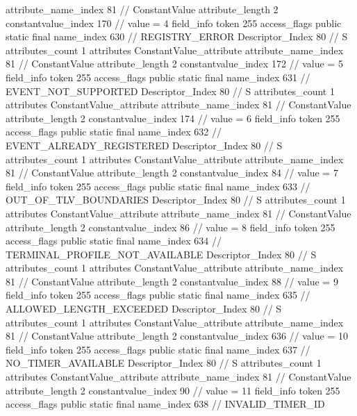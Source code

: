 {{{{{{{					attribute_name_index	81		// ConstantValue
					attribute_length	2
					constantvalue_index	170		// value = 4
				}
				}
			}
			field_info {
				token	255
				access_flags	public static final
				name_index	630		// REGISTRY_ERROR
				Descriptor_Index	80		// S
				attributes_count	1
				attributes {
				ConstantValue_attribute {
					attribute_name_index	81		// ConstantValue
					attribute_length	2
					constantvalue_index	172		// value = 5
				}
				}
			}
			field_info {
				token	255
				access_flags	public static final
				name_index	631		// EVENT_NOT_SUPPORTED
				Descriptor_Index	80		// S
				attributes_count	1
				attributes {
				ConstantValue_attribute {
					attribute_name_index	81		// ConstantValue
					attribute_length	2
					constantvalue_index	174		// value = 6
				}
				}
			}
			field_info {
				token	255
				access_flags	public static final
				name_index	632		// EVENT_ALREADY_REGISTERED
				Descriptor_Index	80		// S
				attributes_count	1
				attributes {
				ConstantValue_attribute {
					attribute_name_index	81		// ConstantValue
					attribute_length	2
					constantvalue_index	84		// value = 7
				}
				}
			}
			field_info {
				token	255
				access_flags	public static final
				name_index	633		// OUT_OF_TLV_BOUNDARIES
				Descriptor_Index	80		// S
				attributes_count	1
				attributes {
				ConstantValue_attribute {
					attribute_name_index	81		// ConstantValue
					attribute_length	2
					constantvalue_index	86		// value = 8
				}
				}
			}
			field_info {
				token	255
				access_flags	public static final
				name_index	634		// TERMINAL_PROFILE_NOT_AVAILABLE
				Descriptor_Index	80		// S
				attributes_count	1
				attributes {
				ConstantValue_attribute {
					attribute_name_index	81		// ConstantValue
					attribute_length	2
					constantvalue_index	88		// value = 9
				}
				}
			}
			field_info {
				token	255
				access_flags	public static final
				name_index	635		// ALLOWED_LENGTH_EXCEEDED
				Descriptor_Index	80		// S
				attributes_count	1
				attributes {
				ConstantValue_attribute {
					attribute_name_index	81		// ConstantValue
					attribute_length	2
					constantvalue_index	636		// value = 10
				}
				}
			}
			field_info {
				token	255
				access_flags	public static final
				name_index	637		// NO_TIMER_AVAILABLE
				Descriptor_Index	80		// S
				attributes_count	1
				attributes {
				ConstantValue_attribute {
					attribute_name_index	81		// ConstantValue
					attribute_length	2
					constantvalue_index	90		// value = 11
				}
				}
			}
			field_info {
				token	255
				access_flags	public static final
				name_index	638		// INVALID_TIMER_ID
}}}}}
